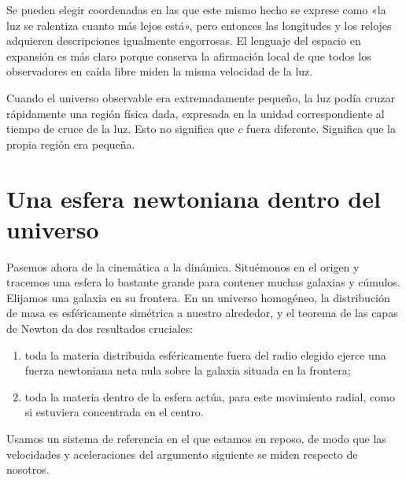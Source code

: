 Se pueden elegir coordenadas en las que este mismo hecho se exprese como «la luz se ralentiza cuanto más lejos está», pero entonces las longitudes y los relojes adquieren descripciones igualmente engorrosas. El lenguaje del espacio en expansión es más claro porque conserva la afirmación local de que todos los observadores en caída libre miden la misma velocidad de la luz.

\begin{classroomqa}\end{classroomqa}

Cuando el universo observable era extremadamente pequeño, la luz podía cruzar rápidamente una región física dada, expresada en la unidad correspondiente al tiempo de cruce de la luz. Esto no significa que \(c\) fuera diferente. Significa que la propia región era pequeña.

\section{Una esfera newtoniana dentro del universo}

Pasemos ahora de la cinemática a la dinámica. Situémonos en el origen y tracemos una esfera lo bastante grande para contener muchas galaxias y cúmulos. Elijamos una galaxia en su frontera. En un universo homogéneo, la distribución de masa es esféricamente simétrica a nuestro alrededor, y el teorema de las capas de Newton da dos resultados cruciales:
\begin{enumerate}
  \item toda la materia distribuida esféricamente fuera del radio elegido ejerce una fuerza newtoniana neta nula sobre la galaxia situada en la frontera;
  \item toda la materia dentro de la esfera actúa, para este movimiento radial, como si estuviera concentrada en el centro.
\end{enumerate}
Usamos un sistema de referencia en el que estamos en reposo, de modo que las velocidades y aceleraciones del argumento siguiente se miden respecto de nosotros.


